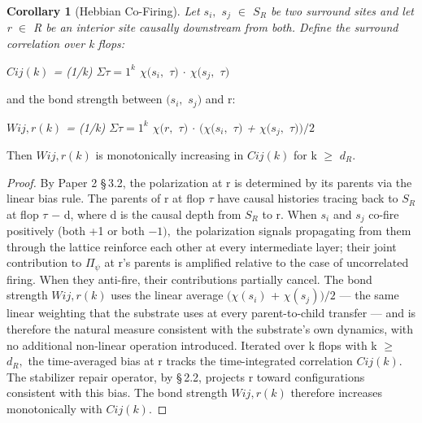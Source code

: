 \documentclass[11pt,oneside]{report}
\newtheorem{corollary}[theorem]{Corollary}
\theoremstyle{definition}
\theoremstyle{remark}
\begin{document}
\begin{corollary}[Hebbian Co-Firing]
Let \ensuremath{s_{i},} \ensuremath{s_{j}} \ensuremath{\in} \ensuremath{S_{R}} be two surround
sites and let r \ensuremath{\in} R be an interior site causally downstream from both.
Define the surround correlation over k flops:
\end{corollary}

\emph{\ensuremath{C{ij}(k)} = (1/k) \ensuremath{\Sigma {\tau =1}^{k}} \ensuremath{\chi (s_{i},} \ensuremath{\tau )} \ensuremath{\cdot} \ensuremath{\chi (s_{j},} \ensuremath{\tau )}}

and the bond strength between \ensuremath{(s_{i},} \ensuremath{s_{j})} and r:

\emph{\ensuremath{W{ij,r}(k)} = (1/k) \ensuremath{\Sigma {\tau =1}^{k}} \ensuremath{\chi (r,} \ensuremath{\tau )} \ensuremath{\cdot} \ensuremath{(\chi (s_{i},} \ensuremath{\tau )} +
\ensuremath{\chi (s_{j},} \ensuremath{\tau ))/2}}

Then \ensuremath{W{ij,r}(k)} is monotonically increasing in
\textbar \ensuremath{C{ij}(k)}\textbar{} for k \ensuremath{\geq} \ensuremath{d_{R}.}

\begin{proof}
By Paper 2 \S\,3.2, the polarization at r is determined by its
parents via the linear bias rule. The parents of r at flop \ensuremath{\tau} have causal
histories tracing back to \ensuremath{S_{R}} at flop \ensuremath{\tau} \ensuremath{-} d, where d is the causal
depth from \ensuremath{S_{R}} to r. When \ensuremath{s_{i}} and \ensuremath{s_{j}} co-fire positively (both +1 or
both \ensuremath{-1),} the polarization signals propagating from them through the
lattice reinforce each other at every intermediate layer; their joint
contribution to \ensuremath{\Pi_{\psi}} at r's parents is amplified relative to the case of
uncorrelated firing. When they anti-fire, their contributions partially
cancel. The bond strength \ensuremath{W{ij,r}(k)} uses the linear average
\ensuremath{(\chi (s_{i})} + \ensuremath{\chi (s_{j}))/2} --- the same linear weighting that the substrate
uses at every parent-to-child transfer --- and is therefore the natural
measure consistent with the substrate's own dynamics, with no additional
non-linear operation introduced. Iterated over k flops with k \ensuremath{\geq} \ensuremath{d_{R},}
the time-averaged bias at r tracks the time-integrated correlation
\ensuremath{C{ij}(k).} The stabilizer repair operator, by \S\,2.2, projects r toward
configurations consistent with this bias. The bond strength
\ensuremath{W{ij,r}(k)} therefore increases monotonically with
\textbar \ensuremath{C{ij}(k)}\textbar.

\end{proof}
\end{document}
